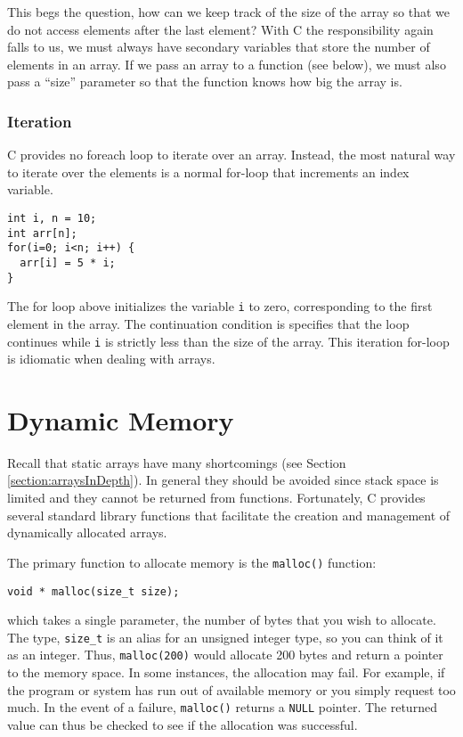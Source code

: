 This begs the question, how can we keep track of the size
of the array so that we do not access elements after the last
element?  With C the responsibility again falls to us, we must
always have secondary variables that store the number of
elements in an array.  If we pass an array to a function (see
below), we must also pass a ``size'' parameter so that the
function knows how big the array is.

\subsubsection{Iteration}

C provides no foreach loop to iterate over an array.  Instead,
the most natural way to iterate over the elements is a normal
for-loop that increments an index variable.

\begin{verbatim}
int i, n = 10;
int arr[n];
for(i=0; i<n; i++) {
  arr[i] = 5 * i;
}
\end{verbatim}

The for loop above initializes the variable \texttt{i} to zero,
corresponding to the first element in the array.  The continuation
condition is specifies that the loop continues while \texttt{i}
is strictly less than the size of the array.  This iteration for-loop
is idiomatic when dealing with arrays.

\section{Dynamic Memory}

Recall that static arrays have many shortcomings (see Section 
\ref{section:arraysInDepth}).  In general they should be avoided
since stack space is limited and they cannot be returned from 
functions.  Fortunately, C provides several standard library 
functions that facilitate the creation and management of 
dynamically allocated arrays.

The primary function to allocate memory is the \texttt{malloc()}
function: 

\texttt{void * malloc(size_t size);}

which takes a single parameter, the number of bytes that you 
wish to allocate.  The type, \texttt{size_t} is an alias for
an unsigned integer type, so you can think of it as an integer.
Thus, \texttt{malloc(200)} would allocate 200 bytes and
return a pointer to the memory space.  In some instances, the
allocation may fail.  For example, if the program or system has
run out of available memory or you simply request too much.
In the event of a failure, \texttt{malloc()} returns a 
\texttt{NULL} pointer.  The returned value can thus
be checked to see if the allocation was successful.


